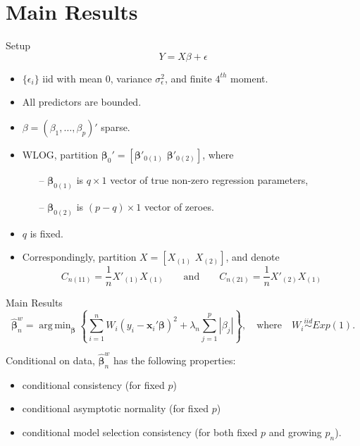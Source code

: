 \documentclass{beamer}
\DeclareMathOperator*{\argmin}{arg\,min}
\newcommand{\bnw}{\widehat{\bm{\beta}}_n^w} %
\newcommand{\be}{\bm{\beta}} %
\newcommand{\sumin}{\sum_{i=1}^n} %
\newcommand{\x}{\bm{x}_i} %
\begin{document}
\section{Main Results}

\begin{frame}{Setup}
	$$
	Y = X \beta + \epsilon
	$$
	\begin{itemize}
		\item $\{\epsilon_i\}$ iid with mean 0, variance $\sigma^2_\epsilon$, and finite $4^{th}$ moment.
		\item All predictors are bounded.
		\item $\beta = (\beta_1, \ldots, \beta_p)'$ sparse.
		\item WLOG, partition $\be_0' = \left[\bm{\beta}'_{0(1)} \,\, \bm{\beta}'_{0(2)} \right]$, where 
		\begin{itemize}
			\item[--] $\bm{\beta}_{0(1)}$ is $q \times 1$ vector of true non-zero regression parameters,
			\item[--] $\bm{\beta}_{0(2)}$ is $(p-q) \times 1$ vector of zeroes.
		\end{itemize} 
		\item $q$ is fixed.
		\item Correspondingly, partition $X = [X_{(1)} \,\, X_{(2)}]$, and denote
		$$
		C_{n(11)} = \frac{1}{n} X'_{(1)} X_{(1)} 
		\qquad 
		\text{and} 
		\qquad
		C_{n(21)} = \frac{1}{n} X'_{(2)} X_{(1)} 
		$$
	\end{itemize}
\end{frame}

\begin{frame}{Main Results}
	$$
	\bnw = \argmin_{\be}
	\left\{
	\sumin W_i ( y_i - \x' \be )^2 
	+ \lambda_n \sum_{j=1}^p |\beta_j|
	\right\},
	\quad \text{where} \quad
	W_i \stackrel{iid}{\sim} Exp(1). 
	$$
	\vspace{1em}
	
	Conditional on data, $\bnw$ has the following properties: 
	\begin{itemize}
		\item conditional consistency (for fixed $p$) 
		\item conditional asymptotic normality (for fixed $p$) 
		\item conditional model selection consistency (for both fixed $p$ and growing $p_n$).
	\end{itemize}
\end{frame}
\end{document}

